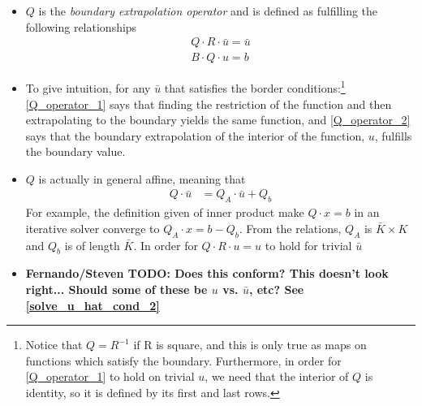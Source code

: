 \documentclass[11pt]{article}
\begin{document}
\begin{itemize}
		\item $Q$ is the \textit{boundary extrapolation operator} and is defined as fulfilling the following relationships
		\begin{align}
		Q \cdot R\cdot\bar{u} = \bar{u}\label{Q_operator_1}\\
		B\cdot Q\cdot u  = b	\label{Q_operator_2}
	\end{align}
	\item To give intuition, for any $\bar{u}$ that satisfies the border conditions:\footnote{Notice that $Q = R^{-1}$ if R is square, and this is only true as maps on functions which satisfy the boundary.  Furthermore, in order for \cref{Q_operator_1} to hold on trivial $u$, we need that the interior of $Q$ is identity, so it is defined by its first and last rows.} \cref{Q_operator_1} says that finding the restriction of the function and then extrapolating to the boundary yields the same function, and \cref{Q_operator_2} says that the boundary extrapolation of the interior of the function, $u$, fulfills the boundary value.
		\item $Q$ is actually in general affine, meaning that
		\begin{align}
			Q\cdot \bar{u} &= Q_A\cdot \bar{u} + Q_b\label{Q_Affine}
			\end{align}
			For example, the definition given of inner product make $Q\cdot x=b$ in an iterative solver converge to $Q_A\cdot x = b - Q_b$. From the relations, $Q_A$ is $\bar{K}\times K$ and $Q_b$ is of length $\bar{K}$. In order for $Q\cdot R\cdot u = u$ to hold for trivial $\bar{u}$
			\item \textbf{Fernando/Steven TODO: Does this conform? This doesn't look right...  Should some of these be $u$ vs. $\bar{u}$, etc?  See \cref{solve_u_hat_cond_2}}
		\end{itemize}
\end{document}
